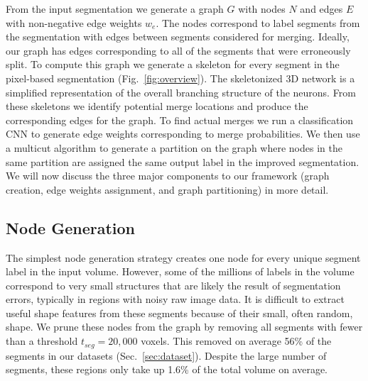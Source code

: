 From the input segmentation we generate a graph $G$ with nodes $N$ and edges $E$ with non-negative edge weights $w_e$. The nodes correspond to label segments from the segmentation with edges between segments considered for merging. Ideally, our graph has edges corresponding to all of the segments that were erroneously split. To compute this graph we generate a skeleton for every segment in the pixel-based segmentation (Fig.~\ref{fig:overview}). The skeletonized 3D network is a simplified representation of the overall branching structure of the neurons. From these skeletons we identify potential merge locations and produce the corresponding edges for the graph. To find actual merges we run a classification CNN to generate edge weights corresponding to merge probabilities. We then use a multicut algorithm to generate a partition on the graph where nodes in the same partition are assigned the same output label in the improved segmentation. We will now discuss the three major components to our framework (graph creation, edge weights assignment, and graph partitioning) in more detail.



\subsection{Node Generation}
\label{sec:skeletonization}

The simplest node generation strategy creates one node for every unique segment label in the input volume. However, some of the millions of labels in the volume correspond to very small structures that are likely the result of segmentation errors, typically in regions with noisy raw image data. It is difficult to extract useful shape features from these segments because of their small, often random, shape. We prune these nodes from the graph by removing all segments with fewer than a threshold $t_{seg} = 20,000$ voxels. This removed on average 56\% of the segments in our  datasets (Sec.~\ref{sec:dataset}). Despite the large number of segments, these regions only take up 1.6\% of the total volume on average.

